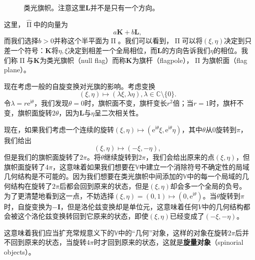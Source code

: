 \begin{figure}[h]
	\centering
	
	\caption{类光旗帜。注意这里$\boldsymbol{L}$并不是只有一个方向。}
	\label{fig:null flag}
\end{figure}

这里，$\hat{\upPi }$中的向量为
\begin{equation*}
	a\boldsymbol{K} +b\boldsymbol{L} ,
\end{equation*}
而我们选择$b >0$并称这个半平面为$\upPi $。我们可以看到，$\upPi $可以将$( \xi ,\eta )$决定到只差一个符号：$\boldsymbol{K}$将$\eta ,\xi $决定到相差一个全局相位，而$\boldsymbol{L}$的方向告诉我们$\eta $的相位。我们称$\upPi $与$\boldsymbol{K}$为类光旗帜（null flag）而称$\boldsymbol{K}$为旗杆（flagpole），$ $$\upPi $为旗帜面（flag plane）。



现在考虑一般的自旋变换对光旗的影响。考虑变换
\begin{equation*}
	( \xi ,\eta ) \mapsto ( \lambda \xi ,\lambda \eta ) ,\lambda \in \mathbb{C} \setminus \{0\} .
\end{equation*}
令$\lambda =r\mathrm{e}^{\mathrm{i} \theta }$，我们发现$\theta =0$时，旗帜面不变，旗杆变长$r^{2}$倍；当$r=1$时，旗杆不变，旗帜面旋转$2\theta $，因为$\boldsymbol{L}$与$\eta $呈二次相关性。



现在，如果我们考虑一个连续的旋转$( \xi ,\eta ) \mapsto (\mathrm{e}^{\mathrm{i} \theta } \xi ,\mathrm{e}^{\mathrm{i} \theta } \eta )$，其中$\theta $从$0$旋转到$\pi $，我们给出
\begin{equation*}
	( \xi ,\eta ) \mapsto ( -\xi ,-\eta ) ,
\end{equation*}
但是我们的旗帜面旋转了$2\pi $。将$\theta $继续旋转到$2\pi $，我们会给出原来的点$( \xi ,\eta )$，但旗帜面旋转了$4\pi $，这意味着如果我们想要在$\mathbb{V}$中建立一个消除符号不确定性的局域几何结构是不可能的。因为我们想要在类光旗帜中间添加的$\mathbb{V}$中的每一个局域的几何结构在旋转了$2\pi $后都会回到原来的状态，但是$( \xi ,\eta )$却会多一个全局的负号。为了更清楚地看到这一点，不妨选择$( \xi ,\eta ) =( 0,1) \mapsto (0,\mathrm{e}^{\mathrm{i} \theta } )$。当$\theta $旋转到$\pi $时，自旋变换为$-\boldsymbol{I}$，但是洛伦兹变换却是单位元，这意味着任何$V$中的几何结构都会被这个洛伦兹变换转回到它原来的状态，即使$( \xi ,\eta )$已经变成了$( -\xi ,-\eta )$。



这意味着我们应当扩充常规意义下的$\mathbb{V}$中的“几何”对象，这样的对象在旋转$2\pi $后并不回到原来的状态，当旋转$4\pi $时才回到原来的状态，这就是\textbf{旋量对象}（spinorial objects）。


